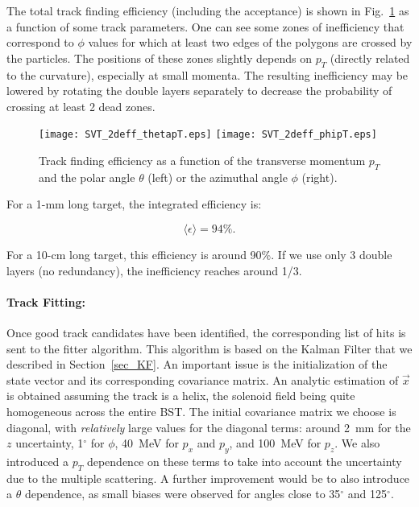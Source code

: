 The total track finding efficiency (including the acceptance) is shown in 
Fig.~\ref{sec_central:pic_eff2d} as a function of some track parameters.  One can 
see some zones of inefficiency that correspond to $\phi$ values for which at least 
two edges of the polygons are crossed by the particles.  The positions of these 
zones slightly depends on $p_T$ (directly related to the curvature), especially at 
small momenta.  The resulting inefficiency may be lowered by rotating the double 
layers separately to decrease the probability of crossing at least 2 dead zones.

\begin{figure}[ht!]
\centering
\texttt{[image: SVT\_2deff\_thetapT.eps]}
\texttt{[image: SVT\_2deff\_phipT.eps]}
\caption{\small{Track finding efficiency as a function of the transverse momentum 
$p_T$ and the polar angle $\theta$ (left) or the azimuthal angle $\phi$ (right).}}
\label{sec_central:pic_eff2d}
\end{figure}

For a 1-mm long target, the integrated efficiency is:

\begin{equation}
\langle \epsilon \rangle = 94\%.
\end{equation}

\noindent
For a 10-cm long target, this efficiency is around 90\%.  If we use only 3 double 
layers (no redundancy), the inefficiency reaches around 1/3.

\paragraph{Track Fitting:}

Once good track candidates have been identified, the corresponding list of hits is 
sent to the fitter algorithm.  This algorithm is based on the Kalman Filter that we 
described in Section~\ref{sec_KF}.  An important issue is the initialization of the 
state vector and its corresponding covariance matrix.  An analytic estimation of 
$\vec{x}$ is obtained assuming the track is a helix, the solenoid field being quite 
homogeneous across the entire BST.  The initial covariance matrix we choose is 
diagonal, with \emph{relatively} large values for the diagonal terms: around 2~mm for 
the $z$ uncertainty, 1$^\circ$ for $\phi$, 40~MeV for $p_x$ and $p_y$, and 100~MeV 
for $p_z$.  We also introduced a $p_T$ dependence on these terms to take into account 
the uncertainty due to the multiple scattering.  A further improvement would be to 
also introduce a $\theta$ dependence, as small biases were observed for angles close 
to 35$^\circ$ and 125$^\circ$.

